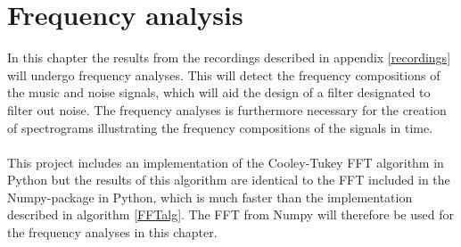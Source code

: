 \chapter{Frequency analysis} \label{ch9}
In this chapter the results from the recordings described in appendix \ref{recordings} will undergo frequency analyses. This will detect the frequency compositions of the music and noise signals, which will aid the design of a filter designated to filter out noise. The frequency analyses is furthermore necessary for the creation of spectrograms illustrating the frequency compositions of the signals in time. \\ \\
This project includes an implementation of the Cooley-Tukey FFT algorithm in Python but the results of this algorithm are identical to the FFT included in the Numpy-package in Python, which is much faster than the implementation described in algorithm \ref{FFTalg}. The FFT from Numpy will therefore be used for the frequency analyses in this chapter.



